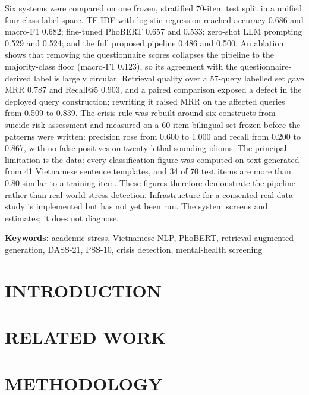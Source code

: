 \documentclass[12pt, twoside]{report}
\begin{document}
Six systems were compared on one frozen, stratified 70-item test split in a unified four-class label space. TF-IDF with logistic regression reached accuracy 0.686 and macro-F1 0.682; fine-tuned PhoBERT 0.657 and 0.533; zero-shot LLM prompting 0.529 and 0.524; and the full proposed pipeline 0.486 and 0.500. An ablation shows that removing the questionnaire scores collapses the pipeline to the majority-class floor (macro-F1 0.123), so its agreement with the questionnaire-derived label is largely circular. Retrieval quality over a 57-query labelled set gave MRR 0.787 and Recall@5 0.903, and a paired comparison exposed a defect in the deployed query construction; rewriting it raised MRR on the affected queries from 0.509 to 0.839. The crisis rule was rebuilt around six constructs from suicide-risk assessment and measured on a 60-item bilingual set frozen before the patterns were written: precision rose from 0.600 to 1.000 and recall from 0.200 to 0.867, with no false positives on twenty lethal-sounding idioms. The principal limitation is the data: every classification figure was computed on text generated from 41 Vietnamese sentence templates, and 34 of 70 test items are more than 0.80 similar to a training item. These figures therefore demonstrate the pipeline rather than real-world stress detection. Infrastructure for a consented real-data study is implemented but has not yet been run. The system screens and estimates; it does not diagnose.

\vspace{0.5em}
\noindent\textbf{Keywords:} academic stress, Vietnamese NLP, PhoBERT, retrieval-augmented generation, DASS-21, PSS-10, crisis detection, mental-health screening

\chapter{INTRODUCTION}\label{ch:intro}
\setcounter{page}{1}


\chapter{RELATED WORK}\label{ch:work}


\chapter{METHODOLOGY}\label{ch:method}

\end{document}
